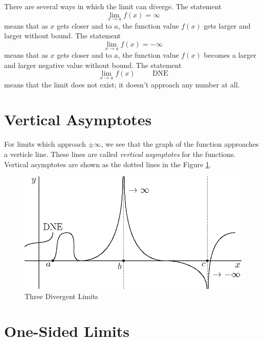 \documentclass[fleqn]{report}
\begin{document}
There are several ways in which the limit can diverge. The
statement
\begin{equation*}
\lim_{x \rightarrow a} f(x) = \infty
\end{equation*}
means that as $x$ gets closer and to $a$, the function value
$f(x)$ gets larger and larger without bound. The statement
\begin{equation*}
\lim_{x \rightarrow a} f(x) = -\infty
\end{equation*}
means that as $x$ gets closer and to $a$, the function value
$f(x)$ becomes a larger and larger negative value without
bound. The statement
\begin{equation*}
\lim_{x \rightarrow a} f(x) \hspace{1cm} \text{DNE}
\end{equation*}
means that the limit does not exist; it doesn't approach any
number at all.

\section*{Vertical Asymptotes}

For limits which approach $\pm \infty$, we see that the graph
of the function approaches a verticle line.  These lines are
called \emph{vertical asymptotes} for the functions.  Vertical
asymptotes are shown as the dotted lines in the Figure
\ref{Three Divergent Limits}.
\clearpage

\begin{figure}[ht]
\centering
\includegraphics{figure19.eps}
\caption{Three Divergent Limits}
\label{Three Divergent Limits}
\end{figure}

\section*{One-Sided Limits}
\end{document}
